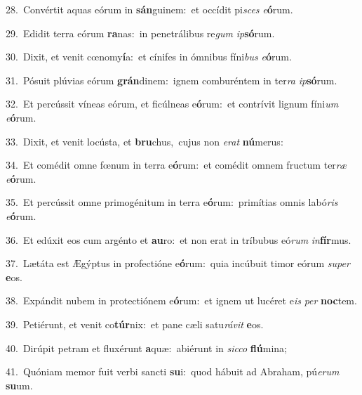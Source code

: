 {\numbfont\textcolor{\numbcolor}{28.}}~Convértit aquas eórum in \textbf{sán}\-guinem:~\star et occídit pi\textit{sces} \textit{e}\-\textbf{ó}rum.\par
{\numbfont\textcolor{\numbcolor}{29.}}~Edidit terra eórum \textbf{ra}\-nas:~\star in penetrálibus re\textit{gum} \textit{ip}\-\textbf{só}rum.\par
{\numbfont\textcolor{\numbcolor}{30.}}~Dixit, et venit cœnomy\-\textbf{í}\-a:~\star et cínifes in ómnibus fíni\textit{bus} \textit{e}\-\textbf{ó}rum.\par
{\numbfont\textcolor{\numbcolor}{31.}}~Pósuit plúvias eórum \textbf{grán}\-dinem:~\star ignem comburéntem in ter\textit{ra} \textit{ip}\-\textbf{só}rum.\par
{\numbfont\textcolor{\numbcolor}{32.}}~Et percússit víneas eórum, et ficúlneas e\-\textbf{ó}\-rum:~\star et contrívit lignum fíni\textit{um} \textit{e}\-\textbf{ó}rum.\par
{\numbfont\textcolor{\numbcolor}{33.}}~Dixit, et venit locústa, et \textbf{bru}\-chus,~\star cujus non \textit{e}\-\textit{rat} \textbf{nú}\-merus:\par
{\numbfont\textcolor{\numbcolor}{34.}}~Et comédit omne fœnum in terra e\-\textbf{ó}\-rum:~\star et comédit omnem fructum ter\textit{ræ} \textit{e}\-\textbf{ó}rum.\par
{\numbfont\textcolor{\numbcolor}{35.}}~Et percússit omne primogénitum in terra e\-\textbf{ó}\-rum:~\star primítias omnis labó\textit{ris} \textit{e}\-\textbf{ó}rum.\par
{\numbfont\textcolor{\numbcolor}{36.}}~Et edúxit eos cum argénto et \textbf{au}\-ro:~\star et non erat in tríbubus eó\textit{rum} \textit{in}\-\textbf{fír}mus.\par
{\numbfont\textcolor{\numbcolor}{37.}}~Lætáta est Ægýptus in profectióne e\-\textbf{ó}\-rum:~\star quia incúbuit timor eórum \textit{su}\-\textit{per} \textbf{e}\-os.\par
{\numbfont\textcolor{\numbcolor}{38.}}~Expándit nubem in protectiónem e\-\textbf{ó}\-rum:~\star et ignem ut lucéret e\textit{is} \textit{per} \textbf{noc}\-tem.\par
{\numbfont\textcolor{\numbcolor}{39.}}~Petiérunt, et venit co\-\textbf{túr}\-nix:~\star et pane cæli satu\-\textit{rá}\-\textit{vit} \textbf{e}\-os.\par
{\numbfont\textcolor{\numbcolor}{40.}}~Dirúpit petram et fluxérunt \textbf{a}\-quæ:~\star abiérunt in \textit{sic}\-\textit{co} \textbf{flú}\-mina;\par
{\numbfont\textcolor{\numbcolor}{41.}}~Quóniam memor fuit verbi sancti \textbf{su}\-i:~\star quod hábuit ad Abraham, pú\-\textit{e}\-\textit{rum} \textbf{su}\-um.\par
